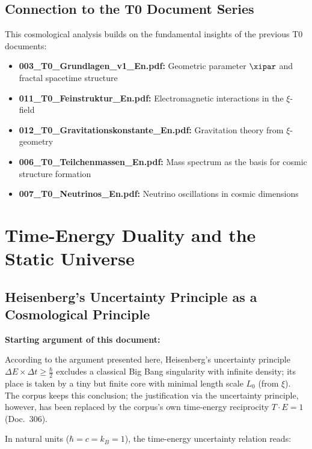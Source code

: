 	\subsection{Connection to the T0 Document Series}
	
	This cosmological analysis builds on the fundamental insights of the previous T0 documents:
	
	\begin{itemize}
		\item \textbf{003\_T0\_Grundlagen\_v1\_En.pdf:} Geometric parameter $\xipar$ and fractal spacetime structure
		\item \textbf{011\_T0\_Feinstruktur\_En.pdf:} Electromagnetic interactions in the $\xi$-field
		\item \textbf{012\_T0\_Gravitationskonstante\_En.pdf:} Gravitation theory from $\xi$-geometry
		\item \textbf{006\_T0\_Teilchenmassen\_En.pdf:} Mass spectrum as the basis for cosmic structure formation
		\item \textbf{007\_T0\_Neutrinos\_En.pdf:} Neutrino oscillations in cosmic dimensions
	\end{itemize}
	
	\section{Time-Energy Duality and the Static Universe}
	
	\subsection{Heisenberg's Uncertainty Principle as a Cosmological Principle}
	
	\begin{revolutionary}
		\textbf{Starting argument of this document:}
		
		According to the argument presented here, Heisenberg's uncertainty principle $\Delta E \times \Delta t \geq \frac{\hbar}{2}$ excludes a classical Big Bang singularity with infinite density; its place is taken by a tiny but finite core with minimal length scale $L_0$ (from $\xi$). The corpus keeps this conclusion; the justification via the uncertainty principle, however, has been replaced by the corpus's own time-energy reciprocity $T\cdot E = 1$ (Doc.~306).
	\end{revolutionary}
	
	In natural units ($\hbar = c = k_B = 1$), the time-energy uncertainty relation reads:
	
